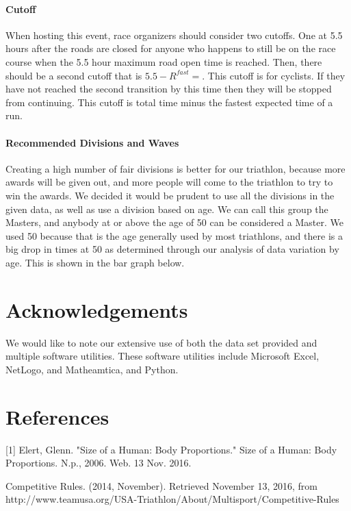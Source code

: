 \documentclass[12pt]{article}
\begin{document}
\paragraph{Cutoff}
When hosting this event, race organizers should consider two cutoffs. One at 5.5 hours after the roads are closed for anyone who happens to still be on the race course when the 5.5 hour maximum road open time is reached. Then, there should be a second cutoff that is $5.5 - R^{fast} = $. This cutoff is for cyclists. If they have not reached the second transition by this time then they will be stopped from continuing. This cutoff is total time minus the fastest expected time of a run.

\paragraph{Recommended Divisions and Waves}
Creating a high number of fair divisions is better for our triathlon, because more awards will be given out, and more people will come to the triathlon to try to win the awards. We decided it would be prudent to use all the divisions in the given data, as well as use a division based on age. We can call this group the Masters, and anybody at or above the age of 50 can be considered a Master. We used 50 because that is the age generally used by most triathlons, and there is a big drop in times at 50 as determined through our analysis of data variation by age. This is shown in the bar graph below.

\section{Acknowledgements}
We would like to note our extensive use of both the data set provided and multiple software utilities. These software utilities include Microsoft Excel, NetLogo, and Matheamtica, and Python.
\section{References}
[1] Elert, Glenn. "Size of a Human: Body Proportions." Size of a Human: Body Proportions. N.p., 2006. Web. 13 Nov. 2016. 
\noindent
\par
[2] Competitive Rules. (2014, November). Retrieved November 13, 2016, from http://www.teamusa.org/USA-Triathlon/About/Multisport/Competitive-Rules
\end{document}
